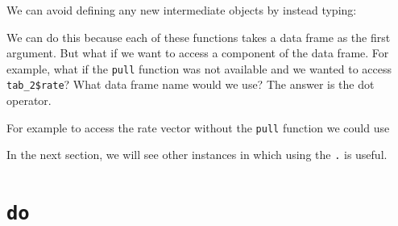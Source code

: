 \documentclass[
]{krantz}
\newenvironment{Shaded}{\begin{snugshade}}{\end{snugshade}}
\newcommand{\CommentTok}[1]{\textcolor[rgb]{0.37,0.37,0.37}{\textit{#1}}}
\newcommand{\DataTypeTok}[1]{\textcolor[rgb]{0.27,0.27,0.27}{#1}}
\newcommand{\DecValTok}[1]{\textcolor[rgb]{0.06,0.06,0.06}{#1}}
\newcommand{\KeywordTok}[1]{\textcolor[rgb]{0.27,0.27,0.27}{\textbf{#1}}}
\newcommand{\NormalTok}[1]{#1}
\newcommand{\OperatorTok}[1]{\textcolor[rgb]{0.43,0.43,0.43}{\textbf{#1}}}
\newcommand{\StringTok}[1]{\textcolor[rgb]{0.5,0.5,0.5}{#1}}
\begin{document}
We can avoid defining any new intermediate objects by instead typing:

\begin{Shaded}
\end{Shaded}

We can do this because each of these functions takes a data frame as the first argument. But what if we want to access a component of the data frame. For example, what if the \texttt{pull} function was not available and we wanted to access \texttt{tab\_2\$rate}? What data frame name would we use? The answer is the dot operator.

For example to access the rate vector without the \texttt{pull} function we could use

\begin{Shaded}
\end{Shaded}

In the next section, we will see other instances in which using the \texttt{.} is useful.

\hypertarget{do}{%
\section{\texorpdfstring{\texttt{do}}{do}}\label{do}}
\end{document}
